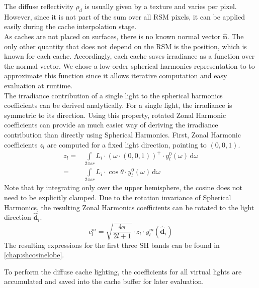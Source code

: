 \documentclass[thesis.tex]{subfiles}
\begin{document}
The diffuse reflectivity $\rho_d$ is usually given by a texture and varies per pixel.
However, since it is not part of the sum over all RSM pixels, it can be applied easily during the cache interpolation stage.\\
As caches are not placed on surfaces, there is no known normal vector $\hat{\mathbf{n}}$.
The only other quantity that does not depend on the RSM is the position, which is known for each cache.
Accordingly, each cache saves irradiance as a function over the normal vector.
We chose a low-order spherical harmonics representation to to approximate this function since it allows iterative computation and easy evaluation at runtime.\\ 
The irradiance contribution of a single light to the spherical harmonics coefficients can be derived analytically. 
For a single light, the irradiance is symmetric to its direction.
Using this property, rotated Zonal Harmonic coefficients can provide an much easier way of deriving the irradiance contribution than directly using Spherical Harmonics.
First, Zonal Harmonic coefficients $z_l$ are computed for a fixed light direction, pointing to $(0,0,1)$.
\begin{align}
z_l =&\int\limits_{2 \pi sr} L_i \cdot (\omega \cdot (0,0,1))^+ \cdot y^0_l(\omega) \,\mathrm{d}\omega\\
=&\int\limits_{2 \pi sr} L_i \cdot \cos\theta \cdot y^0_l(\omega) \,\mathrm{d}\omega
\end{align}
Note that by integrating only over the upper hemisphere, the cosine does not need to be explicitly clamped.
Due to the rotation invariance of Spherical Harmonics, the resulting Zonal Harmonics coefficients can be rotated to the light direction $\hat{\mathbf{d}}_i$.
\begin{equation} \label{eq:zonalrotate}
	c_l^m = \sqrt{\frac{4\pi}{2l+1}} \cdot z_l \cdot y_l^m(\hat{\mathbf{d}}_i)
\end{equation}
The resulting expressions for the first three SH bands can be found in \autoref{chap:shcosinelobe}.

To perform the diffuse cache lighting, the coefficients for all virtual lights are accumulated and saved into the cache buffer for later evaluation. 
\end{document}

